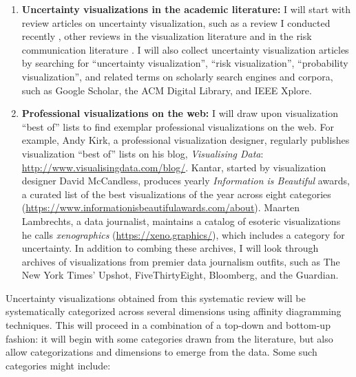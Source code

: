 \documentclass[11pt]{article}
\begin{document}
\vspace{-0.75em}
\begin{enumerate}[noitemsep]
  \item \textbf{Uncertainty visualizations in the academic literature:} I will start with review articles on uncertainty visualization, such as a review I conducted recently \cite{hullman2018pursuit}, other reviews in the visualization literature \cite{MacEachren1992,maceachren_visualizing_2005} and in the risk communication literature \cite{Ancker2006,Garcia-Retamero2013}. I will also collect uncertainty visualization articles by searching for ``uncertainty visualization'', ``risk visualization'', ``probability visualization'', and related terms on scholarly search engines and corpora, such as Google Scholar, the ACM Digital Library, and IEEE Xplore.
  
  \item \textbf{Professional visualizations on the web:} I will draw upon visualization ``best of'' lists to find exemplar professional visualizations on the web. For example, Andy Kirk, a professional visualization designer, regularly publishes visualization ``best of'' lists on his blog, \emph{Visualising Data}: \url{http://www.visualisingdata.com/blog/}. Kantar, started by visualization designer David McCandless, produces yearly \emph{Information is Beautiful} awards, a curated list of the best visualizations of the year across eight categories (\url{https://www.informationisbeautifulawards.com/about}). Maarten Lambrechts, a data journalist, maintains a catalog of esoteric visualizations he calls \emph{xenographics} (\url{https://xeno.graphics/}), which includes a category for uncertainty. In addition to combing these archives, I will look through archives of visualizations from premier data journalism outfits, such as The New York Times’ Upshot, FiveThirtyEight, Bloomberg, and the Guardian.
\end{enumerate}
  
Uncertainty visualizations obtained from this systematic review will be systematically categorized across several dimensions using affinity diagramming techniques. This will proceed in a combination of a top-down and bottom-up fashion: it will begin with some categories drawn from the literature, but also allow categorizations and dimensions to emerge from the data. Some such categories might include:
\end{document}
